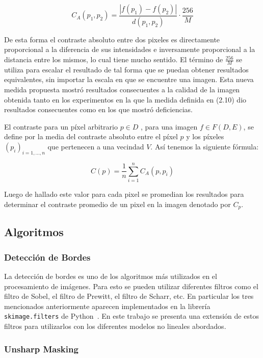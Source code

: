 \begin{equation}
	C_A(p_1,p_2)=\frac{|f(p_1)-f(p_2)|}{d(p_1,p_2)}\cdot\frac{256}{M}
\end{equation}

De esta forma el contraste absoluto entre dos pixeles es directamente proporcional a la diferencia de sus intensidades e inversamente proporcional a la distancia entre los mismos, lo cual tiene mucho sentido. El t\'ermino de $\frac{256}{M}$ se utiliza para escalar el resultado de tal forma que se puedan obtener resultados equivalentes, sin importar la escala en que se encuentre una imagen. Esta nueva medida propuesta mostr\'o resultados consecuentes a la calidad de la imagen obtenida tanto en los experimentos en la que la medida definida en (2.10) dio resultados consecuentes como en los que mostr\'o deficiencias.

El contraste para un píxel arbitrario $p \in D$ , para una imagen $f \in F ( D , E )$, se define por la media del contraste absoluto entre el píxel $p$ y los píxeles $( p_i )_{i = 1,...,n}$ que pertenecen a una vecindad $V$. Así tenemos la siguiente fórmula:

\begin{equation}
	\displaystyle C(p)=\frac{1}{n}\sum_{i=1}^{n}C_A(p,p_i)
\end{equation}

Luego de hallado este valor para cada pixel se promedian los resultados para determinar el contraste promedio de un pixel en la imagen denotado por $C_p$.

\subsection{Algoritmos}

\subsubsection{Detecci\'on de Bordes}

La detecci\'on de bordes es uno de los algoritmos m\'as utilizados en el procesamiento de im\'agenes. Para esto se pueden utilizar diferentes filtros como el filtro de Sobel, el filtro de Prewitt, el filtro de Scharr, etc. En particular los tres mencionados anteriormente aparecen implementados en la librer\'ia \verb|skimage.filters| de Python~\cite{module_filters}. En este trabajo se presenta una extensi\'on de estos filtros para utilizarlos con los diferentes modelos no lineales abordados. 

\subsubsection{Unsharp Masking}


